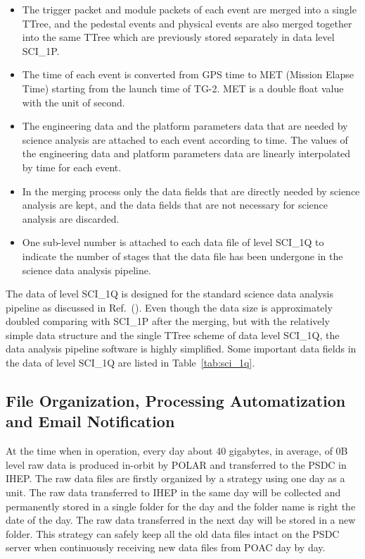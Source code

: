\documentclass{raa}
\begin{document}
\begin{itemize}
\item The trigger packet and module packets of each event are merged into a single TTree, and the pedestal events and physical events are also merged together into the same TTree which are previously stored separately in data level SCI\_1P.
\item The time of each event is converted from GPS time to MET (Mission Elapse Time) starting from the launch time of TG-2. MET is a double float value with the unit of second.
\item The engineering data and the platform parameters data that are needed by science analysis are attached to each event according to time. The values of the engineering data and platform parameters data are linearly interpolated by time for each event.
\item In the merging process only the data fields that are directly needed by science analysis are kept, and the data fields that are not necessary for science analysis are discarded.
\item One sub-level number is attached to each data file of level SCI\_1Q to indicate the number of stages that the data file has been undergone in the science data analysis pipeline.
\end{itemize}

The data of level SCI\_1Q is designed for the standard science data analysis pipeline as discussed in Ref.~(\citealt{LI20188}). Even though the data size is approximately doubled comparing with SCI\_1P after the merging, but with the relatively simple data structure and the single TTree scheme of data level SCI\_1Q, the data analysis pipeline software is highly simplified. Some important data fields in the data of level SCI\_1Q are listed in Table~\ref{tab:sci_1q}.

\subsection{File Organization, Processing Automatization and Email Notification}
At the time when in operation, every day about 40 gigabytes, in average, of 0B level raw data is produced in-orbit by POLAR and transferred to the PSDC in IHEP. The raw data files are firstly organized by a strategy using one day as a unit. The raw data transferred to IHEP in the same day will be collected and permanently stored in a single folder for the day and the folder name is right the date of the day. The raw data transferred in the next day will be stored in a new folder. This strategy can safely keep all the old data files intact on the PSDC server when continuously receiving new data files from POAC day by day.
\end{document}
